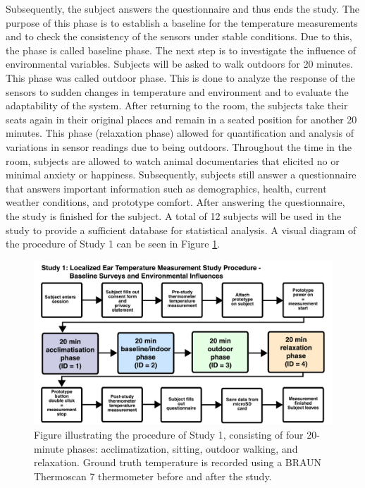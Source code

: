 Subsequently, the subject answers the questionnaire and thus ends the study.
The purpose of this phase is to establish a baseline for the temperature measurements and to check the consistency of the sensors under stable conditions.
Due to this, the phase is called baseline phase.
The next step is to investigate the influence of environmental variables. 
Subjects will be asked to walk outdoors for 20 minutes. 
This phase was called outdoor phase.
This is done to analyze the response of the sensors to sudden changes in temperature and environment and to evaluate the adaptability of the system.
After returning to the room, the subjects take their seats again in their original places and remain in a seated position for another 20 minutes. 
This phase (relaxation phase) allowed for quantification and analysis of variations in sensor readings due to being outdoors.
Throughout the time in the room, subjects are allowed to watch animal documentaries that elicited no or minimal anxiety or happiness. 
Subsequently, subjects still answer a questionnaire that answers important information such as demographics, health, current weather conditions, and prototype comfort.
After answering the questionnaire, the study is finished for the subject.
A total of 12 subjects will be used in the study to provide a sufficient database for statistical analysis.
A visual diagram of the procedure of Study 1 can be seen in Figure \ref{fig:design:study1:procedure}.

\begin{figure}[t]
    \centering
    \includegraphics[width=\textwidth]{thesis-doc/images/study1/Procedure.pdf}
    \caption{Figure illustrating the procedure of Study 1, consisting of four 20-minute phases: acclimatization, sitting, outdoor walking, and relaxation. Ground truth temperature is recorded using a BRAUN Thermoscan 7 thermometer before and after the study.}
    \label{fig:design:study1:procedure}
\end{figure}

